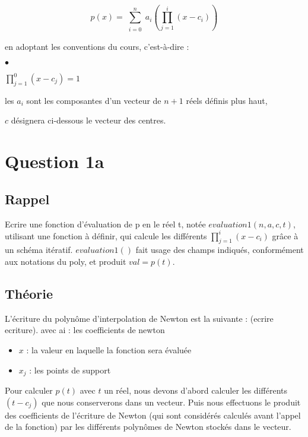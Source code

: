 \documentclass[a4paper,10pt]{report}
\begin{document}
\begin{equation}
p(x) = \sum_{\substack{i=0}}^{n} a_{i} \left(\prod_{j=1}^{i}(x-c_{i})\right)
\end{equation}

en adoptant les conventions du cours, c’est-à-dire :
\begin{list}{}{}
\item \begin{list}{$\bullet$}{}
\item $\prod^{0}_{j=1} (x-c_{j}) = 1$
\item les $a_{i}$ sont les composantes d’un vecteur de $n + 1$ réels définis plus haut,
\item $c$ désignera ci-dessous le vecteur des centres.
\end{list}
\end{list}

\section*{Question 1a}

\subsection*{Rappel}

Ecrire une fonction d’évaluation de p en le réel t, notée $evaluation1(n, a, c, t)$, utilisant une fonction à définir, qui calcule les différents $\prod_{j=1}^{i}(x-c_{i})$
grâce à un schéma itératif. $evaluation1()$ fait usage des champs indiqués, conformément aux notations du poly, et produit $val = p(t)$.

\subsection*{Théorie}

L’écriture du polynôme d’interpolation de Newton est la suivante : (ecrire ecriture).
avec     ai : les coefficients de newton
\begin{itemize}
	\item $x$  : la valeur en laquelle la fonction sera évaluée
    \item $x_{j}$ : les points de support
\end{itemize}
    
Pour calculer $p(t)$ avec $t$ un réel, nous devons d’abord calculer les différents $(t-c_{j})$ que nous conserverons dans un vecteur. Puis nous effectuons le produit des coefficients de l’écriture de Newton (qui sont considérés calculés avant l’appel de la fonction) par les différents polynômes de Newton stockés dans le vecteur.
\end{document}
